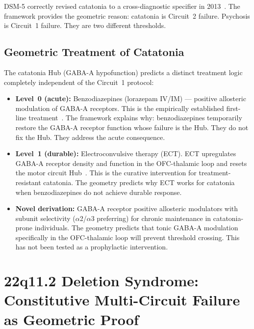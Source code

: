 \documentclass[12pt,a4paper]{article}
\begin{document}
DSM-5 correctly revised catatonia to a cross-diagnostic
specifier in 2013~\cite{DSM5_2013}. The framework provides
the geometric reason: catatonia is Circuit~2 failure. Psychosis
is Circuit~1 failure. They are two different thresholds.

\subsection{Geometric Treatment of Catatonia}

The catatonia Hub (GABA-A hypofunction) predicts a distinct
treatment logic completely independent of the Circuit~1
protocol:

\begin{itemize}
  \item \textbf{Level~0 (acute):} Benzodiazepines (lorazepam
    IV/IM) --- positive allosteric modulation of GABA-A
    receptors. This is the empirically established first-line
    treatment~\cite{Fink2003,Sienaert2014}. The framework
    explains why: benzodiazepines temporarily restore the
    GABA-A receptor function whose failure is the Hub.
    They do not fix the Hub. They address the acute
    consequence.

  \item \textbf{Level~1 (durable):} Electroconvulsive therapy
    (ECT). ECT upregulates GABA-A receptor density and
    function in the OFC-thalamic loop and resets the motor
    circuit Hub~\cite{Gazdag2009}. This is the curative
    intervention for treatment-resistant catatonia. The
    geometry predicts why ECT works for catatonia when
    benzodiazepines do not achieve durable response.

  \item \textbf{Novel derivation:} GABA-A receptor
    positive allosteric modulators with subunit selectivity
    ($\alpha$2/$\alpha$3 preferring) for chronic maintenance
    in catatonia-prone individuals. The geometry predicts
    that tonic GABA-A modulation specifically in the
    OFC-thalamic loop will prevent threshold crossing.
    This has not been tested as a prophylactic intervention.
\end{itemize}

\section{22q11.2 Deletion Syndrome: Constitutive
Multi-Circuit Failure as Geometric Proof}
\end{document}

